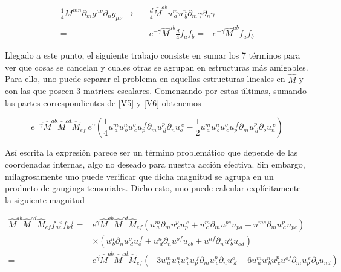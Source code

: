 \documentclass{article}
\numberwithin{equation}{section}
\begin{document}
\begin{equation}\label{V7}
\begin{aligned}
\frac{1}{4} M^{m n} \partial_m g^{\mu \nu} \partial_n g_{\mu \nu} \longrightarrow& - \frac{d}{4} \hat{M}^{a b} u^m_{\ a} u^n_{\ b} \partial_m \gamma \partial_n \gamma\\
=& - e^{- \gamma} \hat{M}^{a b} \frac{d}{4} f_a f_b = - e^{- \gamma} \hat{M}^{a b} f_a f_b
\end{aligned}
\end{equation}

Llegado a este punto, el siguiente trabajo consiste en sumar los 7 términos para ver que cosas se cancelan y cuales otras se agrupan en estructuras más amigables. Para ello, uno puede separar el problema en aquellas estructuras lineales en $ \hat{M} $ y con las que poseen 3 matrices escalares. Comenzando por  estas últimas, sumando las partes correspondientes de \ref{V5} y \ref{V6} obtenemos

\begin{equation}
e^{-\gamma} \hat{M}^{a b} \hat{M}^{c d}\hat{M}_{e f} \ e^{\gamma}  \left( \frac{1}{4}u^{m}_{\ a} u^{n}_{\ b} u^{o}_{\ c} u_{p}^{\ f} \partial_m u^{p}_{\ d} \partial_n u_{o}^{\ e} - \frac{1}{2}u^{m}_{\ a} u^{n}_{\ b} u^{o}_{\ c} u_{p}^{\ f} \partial_m u^{p}_{\ d} \partial_o u_{n}^{\ e} \right)
\end{equation}

Así escrita la expresión parece ser un término problemático que depende de las coordenadas internas, algo no deseado para nuestra acción efectiva. Sin embargo, milagrosamente uno puede verificar que dicha magnitud se agrupa en un producto de gaugings tensoriales. Dicho esto, uno puede calcular explícitamente la siguiente magnitud

\begin{equation}
\begin{aligned}
\hat{M}^{a b} \hat{M}^{c d}\hat{M}_{e f} f_{a c}^{\ \ \ e} f_{b d}^{\ \ \ f} =& e^{\gamma} \hat{M}^{a b} \hat{M}^{c d}\hat{M}_{e f} \left( u^{m}_{ \ a} \partial_m u^{p}_{\ c} u_{ p}^{\ e} + u^{m}_{ \ c} \partial_m u^{p e} u_{ p a} + u^{m e} \partial_m u^{p}_{\ a} u_{ p c} \right)\\
&\times \left( u^{n}_{ \ b} \partial_n u^{o}_{\ d} u_{ o}^{\ f} + u^{n}_{ \ d} \partial_n u^{o f} u_{ o b} + u^{n f} \partial_n u^{o}_{\ b} u_{ o d} \right)\\
=& e^{\gamma} \hat{M}^{a b} \hat{M}^{c d}\hat{M}_{e f} \left( -3 u^{m}_{\ a} u^{n}_{\ b} u^{o}_{\ c} u_{p}^{\ f} \partial_m u^{p}_{\ c} \partial_n u^{o}_{\ d} + 6 u^{m}_{\ a} u^{n}_{\ b} u^{p}_{\ c} u^{o f} \partial_m u_{p}^{\ e} \partial_o u_{n d} \right)
\end{aligned}
\end{equation}
\end{document}
